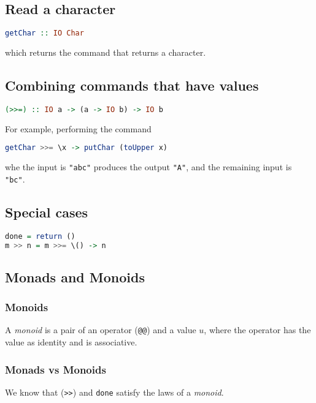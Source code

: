 \documentclass{article}
\begin{document}
\subsection{Read a character}
\begin{lstlisting}[language=haskell]
getChar :: IO Char
\end{lstlisting}
which returns the command that returns a character.
\subsection{Combining commands that have values}
\begin{lstlisting}[language=haskell]
(>>=) :: IO a -> (a -> IO b) -> IO b
\end{lstlisting}
For example, performing the command
\begin{lstlisting}[language=haskell]
getChar >>= \x -> putChar (toUpper x)
\end{lstlisting}
whe the input is \texttt{"abc"} produces the output \texttt{"A"}, and the remaining input is \texttt{"bc"}.
\subsection{Special cases}
\begin{lstlisting}[language=haskell]
done = return ()
m >> n = m >>= \() -> n
\end{lstlisting}
\subsection{Monads and Monoids}
\subsubsection{Monoids}
A \emph{monoid} is a pair of an operator (\texttt{@@}) and a value $u$, where the operator has the value as identity and is associative.
\subsubsection{Monads vs Monoids}
We know that (\texttt{>>}) and \texttt{done} satisfy the laws of a \emph{monoid}.
\end{document}
